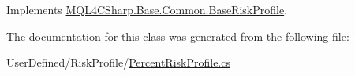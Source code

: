 Implements \hyperlink{class_m_q_l4_c_sharp_1_1_base_1_1_common_1_1_base_risk_profile_ab26baa99ebc54441e2aaf073b070871b}{M\+Q\+L4\+C\+Sharp.\+Base.\+Common.\+Base\+Risk\+Profile}.



The documentation for this class was generated from the following file\+:\begin{DoxyCompactItemize}
\item 
User\+Defined/\+Risk\+Profile/\hyperlink{_percent_risk_profile_8cs}{Percent\+Risk\+Profile.\+cs}\end{DoxyCompactItemize}
